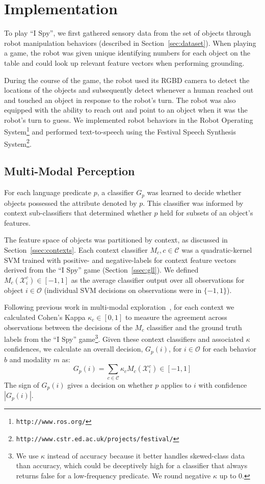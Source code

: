 \documentclass{article}
\newcommand{\ispy}{``I Spy''\xspace}
\begin{document}
\section{Implementation}
\label{sec:implementation}
To play \ispy, we first gathered sensory data from the set of objects through robot manipulation behaviors (described in Section~\ref{sec:dataset}).
When playing a game, the robot was given unique identifying numbers for each object on the table and could look up relevant feature vectors when performing grounding.

During the course of the game, the robot used its RGBD camera to detect the locations of the objects and subsequently detect whenever a human reached out and touched an object in response to the robot's turn.
The robot was also equipped with the ability to reach out and point to an object when it was the robot's turn to guess.
We implemented robot behaviors in the Robot Operating System\footnote{\texttt{http://www.ros.org/}} and performed text-to-speech using the Festival Speech Synthesis System\footnote{\texttt{http://www.cstr.ed.ac.uk/projects/festival/}}.

	\subsection{Multi-Modal Perception}
	\label{ssec:mmp}
For each language predicate $p$, a classifier $G_p$ was learned to decide whether objects possessed the attribute denoted by $p$.
This classifier was informed by context sub-classifiers that determined whether $p$ held for subsets of an object's features.

The feature space of objects was partitioned by context, as discussed in Section~\ref{ssec:contexts}.
Each context classifier $M_{c}, c\in\mathcal{C}$ was a quadratic-kernel SVM trained with positive- and negative-labels for context feature vectors derived from the \ispy game (Section~\ref{ssec:gll}).
We defined $M_{c}(\mathcal{X}_i^c)\in [-1,1]$ as the average classifier output over all observations for object $i\in\mathcal{O}$ (individual SVM decisions on observations were in $\{-1,1\}$).

Following previous work in multi-modal exploration~\cite{sinapov:icra14}, for each context we calculated Cohen's Kappa $\kappa_{c}\in[0,1]$ to measure the agreement across observations between the decisions of the $M_{c}$ classifier and the ground truth labels from the \ispy game\footnote{We use $\kappa$ instead of accuracy because it better handles skewed-class data than accuracy, which could be deceptively high for a classifier that always returns false for a low-frequency predicate. We round negative $\kappa$ up to $0$.}.
Given these context classifiers and associated $\kappa$ confidences, we calculate an overall decision, $G_p(i)$, for $i\in\mathcal{O}$ for each behavior $b$ and modality $m$ as:
\begin{equation}
	G_p(i) = \sum_{c\in\mathcal{C}}{\kappa_{c} M_{c}(\mathcal{X}_i^c)} \in [-1,1]
\end{equation}
The sign of $G_p(i)$ gives a decision on whether $p$ applies to $i$ with confidence $|G_p(i)|$.
\end{document}
